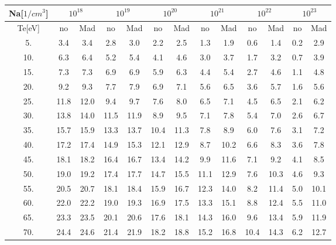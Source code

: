 \begin{tabular}{|c||c|c|c|c|c|c|c|c|c|c|c|c|}
\hline
Na[$1/cm^3$] & \multicolumn{2}{|c|}{$10^{18}$} & \multicolumn{2}{|c|}{$10^{19}$} & \multicolumn{2}{|c|}{$10^{20}$} & \multicolumn{2}{|c|}{$10^{21}$} & \multicolumn{2}{|c|}{$10^{22}$} & \multicolumn{2}{|c|}{$10^{23}$}\tabularnewline
\hline
Te[eV] & no & Mad & no & Mad & no & Mad & no & Mad & no & Mad & no & Mad\tabularnewline
\hline
\hline
   5. &     3.4 &     3.4 &     2.8 &     3.0 &     2.2 &     2.5 &     1.3 &     1.9 &     0.6 &     1.4 &     0.2 &     2.9\tabularnewline
\hline
  10. &     6.3 &     6.4 &     5.2 &     5.4 &     4.1 &     4.6 &     3.0 &     3.7 &     1.7 &     3.2 &     0.7 &     3.9\tabularnewline
\hline
  15. &     7.3 &     7.3 &     6.9 &     6.9 &     5.9 &     6.3 &     4.4 &     5.4 &     2.7 &     4.6 &     1.1 &     4.8\tabularnewline
\hline
  20. &     9.2 &     9.3 &     7.7 &     7.9 &     6.9 &     7.1 &     5.6 &     6.5 &     3.6 &     5.7 &     1.6 &     5.6\tabularnewline
\hline
  25. &    11.8 &    12.0 &     9.4 &     9.7 &     7.6 &     8.0 &     6.5 &     7.1 &     4.5 &     6.5 &     2.1 &     6.2\tabularnewline
\hline
  30. &    13.8 &    14.0 &    11.5 &    11.9 &     8.9 &     9.5 &     7.1 &     7.8 &     5.4 &     7.0 &     2.6 &     6.7\tabularnewline
\hline
  35. &    15.7 &    15.9 &    13.3 &    13.7 &    10.4 &    11.3 &     7.8 &     8.9 &     6.0 &     7.6 &     3.1 &     7.2\tabularnewline
\hline
  40. &    17.2 &    17.4 &    14.9 &    15.3 &    12.1 &    12.9 &     8.7 &    10.2 &     6.6 &     8.3 &     3.6 &     7.8\tabularnewline
\hline
  45. &    18.1 &    18.2 &    16.4 &    16.7 &    13.4 &    14.2 &     9.9 &    11.6 &     7.1 &     9.2 &     4.1 &     8.5\tabularnewline
\hline
  50. &    19.0 &    19.2 &    17.4 &    17.7 &    14.7 &    15.5 &    11.1 &    12.9 &     7.6 &    10.3 &     4.6 &     9.3\tabularnewline
\hline
  55. &    20.5 &    20.7 &    18.1 &    18.4 &    15.9 &    16.7 &    12.3 &    14.0 &     8.2 &    11.4 &     5.0 &    10.1\tabularnewline
\hline
  60. &    22.0 &    22.2 &    19.0 &    19.3 &    16.9 &    17.5 &    13.3 &    15.1 &     8.8 &    12.4 &     5.5 &    11.0\tabularnewline
\hline
  65. &    23.3 &    23.5 &    20.1 &    20.6 &    17.6 &    18.1 &    14.3 &    16.0 &     9.6 &    13.4 &     5.9 &    11.9\tabularnewline
\hline
  70. &    24.4 &    24.6 &    21.4 &    21.9 &    18.2 &    18.8 &    15.2 &    16.8 &    10.4 &    14.3 &     6.2 &    12.7\tabularnewline

\end{tabular}
